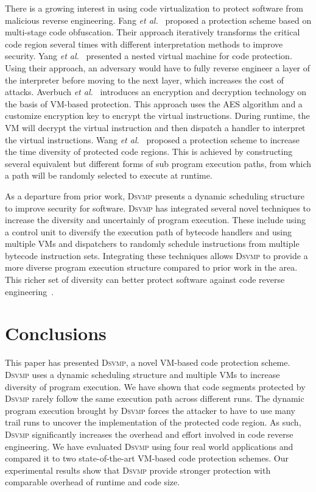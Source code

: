 \documentclass[conference]{IEEEtran}
\newcommand{\DSVMP}{\textsc{Dsvmp}\xspace}
\begin{document}
There is a growing interest in using code virtualization to protect software from malicious reverse engineering.
Fang \emph{et al.}~\cite{5fang2011multi} proposed a protection scheme based on multi-stage code obfuscation. Their approach iteratively transforms the critical code region several times with different interpretation methods to improve security.
Yang \emph{et al.}~\cite{6ming2011software} presented a nested virtual machine for code protection. Using their approach, an adversary would have to fully reverse engineer a layer of the interpreter before moving to the next layer, which increases the cost of attacks.
Averbuch \emph{et al.}~\cite{27averbuch2011efficient} introduces an encryption and decryption technology on the basis of VM-based protection. This approach uses the AES algorithm and a customize encryption key to encrypt the virtual instructions. During runtime, the VM will decrypt the virtual instruction and then dispatch a handler to interpret the virtual instructions.
Wang \emph{et al.}~\cite{7wang2014tdvmp} proposed a protection scheme to increase the time diversity of protected code regions. This is achieved by constructing several equivalent but different forms of sub program execution paths, from which a path will be randomly selected to execute at runtime.

As a departure from prior work, \DSVMP presents a dynamic scheduling structure to improve security for software.
\DSVMP has integrated several novel techniques to increase the diversity and uncertainly of program execution. These include using a control unit to diversify the execution path of bytecode handlers and using multiple VMs and dispatchers to randomly schedule instructions from multiple bytecode instruction sets.
Integrating these techniques allows \DSVMP to provide a more diverse program execution structure compared to prior work in the area. This richer set of diversity can better protect software against code reverse engineering~\cite{20larsen2014sok}.


\section{Conclusions}
This paper has presented \DSVMP, a novel VM-based code protection scheme.
\DSVMP uses a dynamic scheduling structure and multiple VMs to increase
diversity of program execution. We have shown that code
segments protected by \DSVMP rarely follow the same execution path across
different runs. The dynamic program execution brought by \DSVMP forces the attacker
to have to use many trail runs to uncover the implementation of the protected code
region. As such, \DSVMP significantly increases the overhead and effort
involved in code reverse engineering. We have evaluated \DSVMP using four
real world applications and compared it to two state-of-the-art VM-based code
protection schemes. Our experimental results show that \DSVMP provide
stronger protection with comparable overhead of runtime and code size.
\end{document}
